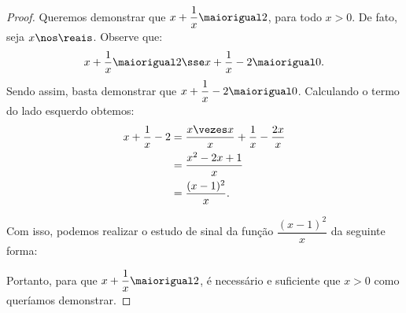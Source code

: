 \begin{proof}
    Queremos demonstrar que $x + \dfrac 1 x \maiorigual 2$, para todo $x > 0$. De fato, seja $x \nos \reais$. Observe que:
    \[
        x + \dfrac 1 x \maiorigual 2 \sse x + \dfrac 1 x - 2 \maiorigual 0.
    \]
    Sendo assim, basta demonstrar que $x + \dfrac 1 x - 2 \maiorigual 0$. Calculando o termo do lado esquerdo obtemos:
    \begin{align*}
        x + \dfrac 1 x - 2 &= \dfrac {x \vezes x} x + \dfrac 1 x -  \dfrac {2x} x \\
                           &= \dfrac {x^2 - 2x + 1} x \\
                           &= \dfrac {(x - 1)^2} x.
    \end{align*}

    Com isso, podemos realizar o estudo de sinal da função $\dfrac {(x - 1)^2} x$ da seguinte forma:
    \begin{figure}[H]
        \centering
        \caption{}
    \end{figure}

    Portanto, para que $x + \dfrac 1 x \maiorigual 2$, é necessário e suficiente que $x > 0$ como queríamos demonstrar.
\end{proof}